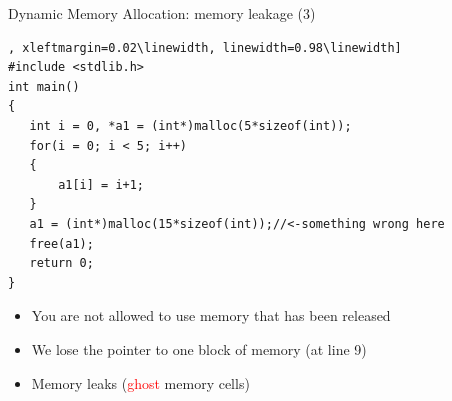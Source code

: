 \begin{frame}[fragile]{Dynamic Memory Allocation: memory leakage (3)}

\begin{lstlisting}, xleftmargin=0.02\linewidth, linewidth=0.98\linewidth]
#include <stdlib.h>
int main()
{
   int i = 0, *a1 = (int*)malloc(5*sizeof(int));
   for(i = 0; i < 5; i++)
   {
       a1[i] = i+1;
   }
   a1 = (int*)malloc(15*sizeof(int));//<-something wrong here
   free(a1);
   return 0;
}
\end{lstlisting}

\vspace{-0.15in}
\begin{itemize}
	\item {You are not allowed to use memory that has been released}
	\item {We lose the pointer to one block of memory (at line 9)}
	\item {Memory leaks (\textcolor{red}{ghost} memory cells)}
\end{itemize}
\end{frame}


